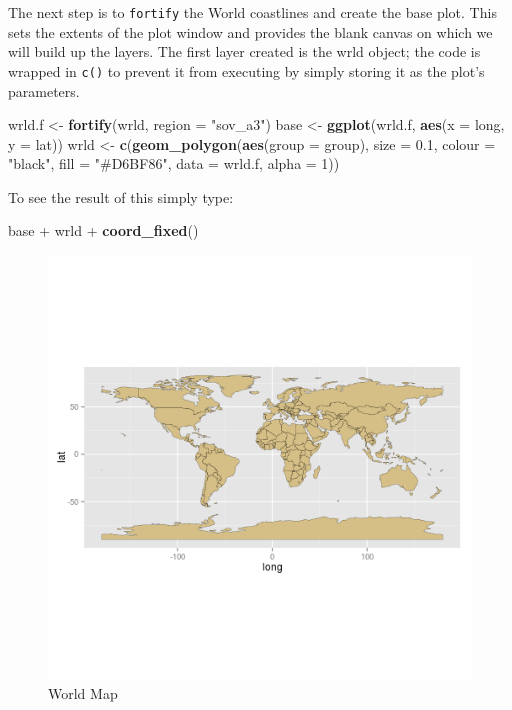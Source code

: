 \documentclass[]{article}
\newenvironment{Shaded}{}{}
\newcommand{\KeywordTok}[1]{\textcolor[rgb]{0.00,0.44,0.13}{\textbf{{#1}}}}
\newcommand{\DataTypeTok}[1]{\textcolor[rgb]{0.56,0.13,0.00}{{#1}}}
\newcommand{\DecValTok}[1]{\textcolor[rgb]{0.25,0.63,0.44}{{#1}}}
\newcommand{\FloatTok}[1]{\textcolor[rgb]{0.25,0.63,0.44}{{#1}}}
\newcommand{\StringTok}[1]{\textcolor[rgb]{0.25,0.44,0.63}{{#1}}}
\newcommand{\NormalTok}[1]{{#1}}
\begin{document}
The next step is to \texttt{fortify} the World coastlines and create the
base plot. This sets the extents of the plot window and provides the
blank canvas on which we will build up the layers. The first layer
created is the wrld object; the code is wrapped in \texttt{c()} to
prevent it from executing by simply storing it as the plot's parameters.

\begin{Shaded}
\begin{Highlighting}[]
\NormalTok{wrld.f <-}\StringTok{ }\KeywordTok{fortify}\NormalTok{(wrld, }\DataTypeTok{region =} \StringTok{"sov_a3"}\NormalTok{)}
\NormalTok{base <-}\StringTok{ }\KeywordTok{ggplot}\NormalTok{(wrld.f, }\KeywordTok{aes}\NormalTok{(}\DataTypeTok{x =} \NormalTok{long, }\DataTypeTok{y =} \NormalTok{lat))}
\NormalTok{wrld <-}\StringTok{ }\KeywordTok{c}\NormalTok{(}\KeywordTok{geom_polygon}\NormalTok{(}\KeywordTok{aes}\NormalTok{(}\DataTypeTok{group =} \NormalTok{group), }\DataTypeTok{size =} \FloatTok{0.1}\NormalTok{, }\DataTypeTok{colour =} \StringTok{"black"}\NormalTok{, }\DataTypeTok{fill =} \StringTok{"#D6BF86"}\NormalTok{, }
    \DataTypeTok{data =} \NormalTok{wrld.f, }\DataTypeTok{alpha =} \DecValTok{1}\NormalTok{))}
\end{Highlighting}
\end{Shaded}

To see the result of this simply type:

\begin{Shaded}
\begin{Highlighting}[]
\NormalTok{base +}\StringTok{ }\NormalTok{wrld +}\StringTok{ }\KeywordTok{coord_fixed}\NormalTok{()}
\end{Highlighting}
\end{Shaded}

\begin{figure}[htbp]
\centering
\includegraphics{figure/World_Map.png}
\caption{World Map}
\end{figure}
\end{document}
